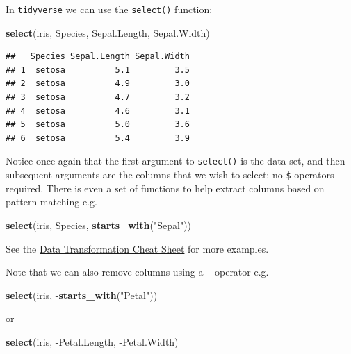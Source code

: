 \documentclass[]{book}
\newenvironment{Shaded}{\begin{snugshade}}{\end{snugshade}}
\newcommand{\KeywordTok}[1]{\textcolor[rgb]{0.13,0.29,0.53}{\textbf{{#1}}}}
\newcommand{\StringTok}[1]{\textcolor[rgb]{0.31,0.60,0.02}{{#1}}}
\newcommand{\NormalTok}[1]{{#1}}
\theoremstyle{definition}
\theoremstyle{definition}
\theoremstyle{definition}
\theoremstyle{remark}
\begin{document}
In \texttt{tidyverse} we can use the \texttt{select()} function:

\begin{Shaded}
\begin{Highlighting}[]
\KeywordTok{select}\NormalTok{(iris, Species, Sepal.Length, Sepal.Width)}
\end{Highlighting}
\end{Shaded}

\begin{verbatim}
##   Species Sepal.Length Sepal.Width
## 1  setosa          5.1         3.5
## 2  setosa          4.9         3.0
## 3  setosa          4.7         3.2
## 4  setosa          4.6         3.1
## 5  setosa          5.0         3.6
## 6  setosa          5.4         3.9
\end{verbatim}

Notice once again that the first argument to \texttt{select()} is the
data set, and then subsequent arguments are the columns that we wish to
select; no \texttt{\$} operators required. There is even a set of
functions to help extract columns based on pattern matching e.g.

\begin{Shaded}
\begin{Highlighting}[]
\KeywordTok{select}\NormalTok{(iris, Species, }\KeywordTok{starts_with}\NormalTok{(}\StringTok{"Sepal"}\NormalTok{))}
\end{Highlighting}
\end{Shaded}

See the
\href{https://github.com/rstudio/cheatsheets/raw/master/data-transformation.pdf}{Data
Transformation Cheat Sheet} for more examples.

Note that we can also remove columns using a \texttt{-} operator e.g.

\begin{Shaded}
\begin{Highlighting}[]
\KeywordTok{select}\NormalTok{(iris, -}\KeywordTok{starts_with}\NormalTok{(}\StringTok{"Petal"}\NormalTok{))}
\end{Highlighting}
\end{Shaded}

or

\begin{Shaded}
\begin{Highlighting}[]
\KeywordTok{select}\NormalTok{(iris, -Petal.Length, -Petal.Width)}
\end{Highlighting}
\end{Shaded}
\end{document}

